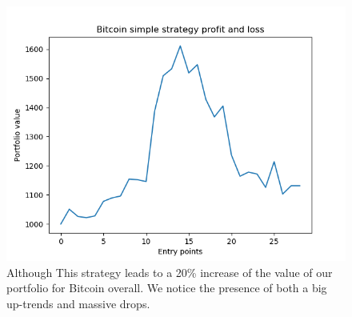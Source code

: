\documentclass[twoside]{report}
\begin{document}
\begin{spacing}{1}
\begin{figure}[!htbp]
    \centering
    \includegraphics[scale = 0.5]{TestPlots/plot-BTC-pnl.png}
    \caption{Although This strategy leads to a 20\% increase of the value of our portfolio for Bitcoin overall. We notice the presence of both a big up-trends and massive drops.}
    \label{}
\end{figure}


\end{spacing}
\end{document}
